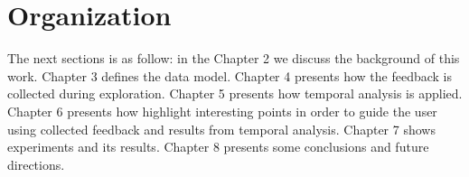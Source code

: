 \section{Organization}

The next sections is as follow: in the Chapter 2 we discuss the background of this work. Chapter 3 defines the data model. Chapter 4 presents how the feedback is collected during exploration. Chapter 5 presents how temporal analysis is applied. Chapter 6 presents how highlight interesting points in order to guide the user using collected feedback and results from temporal analysis. Chapter 7 shows experiments and its results. Chapter 8 presents some conclusions and future directions.
